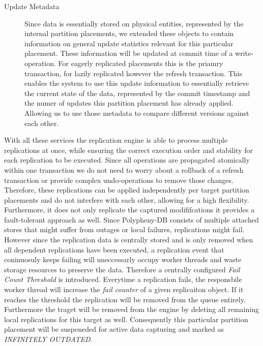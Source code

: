\begin{description}
    \item[Update Metadata] Since data is essentially stored on physical entities, represented by the internal partition placements, we extended these objects 
    to contain information on general update statistics relevant for this particular placement. These information will be updated at commit time of a write-operation.
    For eagerly replicated placements this is the priamry transaction, for lazily replicated however the refresh transaction.
    This enables the system to use this update information to essentially retrieve the current state of the data, represented by the commit timestamp
    and the numer of updates this partition placement has already applied. Allowing us to use those metadata to compare different versions against each other.

\end{description}



With all these services the replication engine is able to process multiple replications at once, while ensuring the correct execution order and stability
for each replication to be executed. 
Since all operations are propagated atomically within one transaction we do not need to worry about a rollback of a refresh transaction or provide complex undo-operations 
to remove those changes. Therefore, these replications can be applied independently per target partition placements and do not interfere with each other, 
allowing for a high flexibility.
Furthermore, it does not only replicate the captured modififcations it provides a fault-tolerant approach as well. 
Since Polypheny-DB consists of multiple attached stores that might suffer from outages or local failures, replications might fail.
However since the replication data is centrally stored and is only removed when all dependent replications have been executed, 
a replication event that coninuosuly keeps failing will uneccessarly occupy worker threads and waste storage resources to preserve the data.
Therefore a centrally configured \emph{Fail Count Threshold} is introduced. Everytime a replication fails, the responsbile worker thread will increase the \textit{fail counter} 
of a given replicaiton object. If it reaches the threshold the replication will be removed from the queue entirely. 
Furthermore the traget will be removed from the engine by deleting all remaining local replications for this target as well.
Consequently this particular partition placement will be suspeneded for active data capturing and marked as \emph{INFINITELY OUTDATED}.\\

